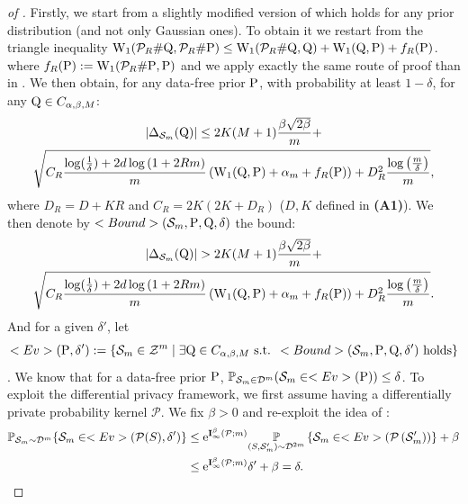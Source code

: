 \begin{proof}[of ]
Firstly, we start from a slightly modified version of  which holds for any prior distribution (and not only Gaussian ones).
To obtain it we restart from the triangle inequality $\W_{1}(\mathcal{P}_{R}\# \Q, \mathcal{P}_{R}\# \P ) \leq \W_{1}(\mathcal{P}_{R}\# \Q,\Q) + \W_{1}(\Q,\P) + f_R(\P)$. where $f_R(\P) := \W_{1}(\mathcal{P}_{R}\#\P,\P)$ and we apply exactly the same route of proof than in . We then obtain, for any data-free prior $\P$, with probability at least $1-\delta$, for any $\Q\in C_{\alpha,\beta,M}$:
\begin{multline*}
|\Delta_{\Sm}(\Q)| \leq 2K(M+1)\frac{\beta\sqrt{2\beta}}{m} + \\
\sqrt{ C_R \frac{\log(\frac{1}{\delta}) + 2d\log\left(1 +2Rm \right)}{m} \left(\W_{1}(\Q,\P)+\alpha_m  + f_R(\P)\right) + D_R^2\frac{\log\left( \frac{m}{\delta} \right)}{m} },
\end{multline*}
where $D_R= D+KR$ and $C_R= 2K(2K+D_R)$ ($D,K$ defined in \textbf{(A1)}).
We then denote by $\texttt{Bound}(\Sm,\P,\Q,\delta)$ the bound:
\begin{multline*}
|\Delta_{\Sm}(\Q)| > 2K(M+1)\frac{\beta\sqrt{2\beta}}{m} + \\
\sqrt{ C_R \frac{\log(\frac{1}{\delta}) + 2d\log\left(1 +2Rm \right)}{m} \left(\W_{1}(\Q,\P)+\alpha_m  + f_R(\P)\right) + D_R^2\frac{\log\left( \frac{m}{\delta} \right)}{m} }.
\end{multline*}
And for a given $\delta'$, let $$\texttt{Ev}(\P,\delta'):= \{\Sm \in \mathcal{Z}^m \mid  \exists \Q \in C_{\alpha,\beta,M} \text{ s.t. } \texttt{Bound}(\Sm,\P,\Q,\delta') \text{ holds} \}$$.
We know that for a data-free prior $\P$, $\mathbb{P}_{\Sm\in\D^m}(\Sm\in \texttt{Ev}(\P)) \leq \delta$.
To exploit the differential privacy framework, we first assume having a differentially private probability kernel $\mathcal{P}$. We fix $\beta>0$ and re-exploit the idea of \citet{dziugaite2018data}:
\begin{align}
\label{eq: pac_b_diff_priv}
\mathbb{P}_{\Sm \sim \D^m}\{\Sm \in \texttt{Ev}(\mathcal{P}(S),\delta')\} & \leq \mathrm{e}^{\mathbf{I}_{\infty}^\beta(\mathcal{P} ; m)} \underset{\left(S, \Sm^{\prime}\right) \sim \D^{2m} }{\mathbb{P}}\left\{\Sm \in \texttt{Ev}\left(\mathcal{P}\left(\Sm^{\prime}\right)\right)\right\}+\beta \\
& \leq \mathrm{e}^{\mathbf{I}_{\infty}^\beta(\mathcal{P} ; m)} \delta^{\prime}+\beta = \delta .
\end{align}

\end{proof}
